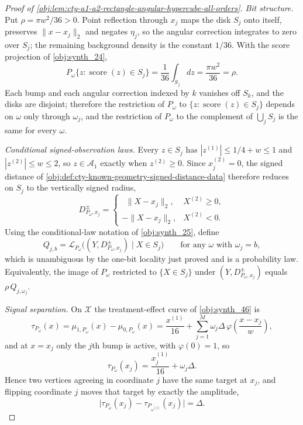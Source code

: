 \begin{proof}[Proof of \cref{obj:lem:cty-a1-a2-rectangle-angular-hypercube-all-orders}]
\emph{Bit structure.}
Put \(\rho=\pi w^2/36>0\).  Point reflection through \(x_j\) maps the disk \(S_j\) onto itself, preserves \(\lVert x-x_j\rVert_2\) and negates \(\eta_j\), so the angular correction integrates to zero over \(S_j\); the remaining background density is the constant \(1/36\).  With the score projection of \cref{obj:synth_24},
\[
P_\omega\{z:\operatorname{score}(z)\in S_j\}
=
\frac1{36}\int_{S_j}dz
=
\frac{\pi w^2}{36}
=\rho .
\]
Each bump and each angular correction indexed by \(k\) vanishes off \(S_k\), and the disks are disjoint; therefore the restriction of \(P_\omega\) to \(\{z:\operatorname{score}(z)\in S_j\}\) depends on \(\omega\) only through \(\omega_j\), and the restriction of \(P_\omega\) to the complement of \(\bigcup_{j}S_j\) is the same for every \(\omega\).

\emph{Conditional signed-observation laws.}
Every \(z\in S_j\) has \(|z^{(1)}|\leq1/4+w\leq1\) and \(|z^{(2)}|\leq w\leq2\), so \(z\in\mathcal A_1\) exactly when \(z^{(2)}\geq0\).  Since \(x_j^{(2)}=0\), the signed distance of \cref{obj:def:cty-known-geometry-signed-distance-data} therefore reduces on \(S_j\) to the vertically signed radius,
\[
D^{\pm}_{P_\omega,x_j}
=
\begin{cases}
\ \ \lVert X-x_j\rVert_2, & X^{(2)}\geq 0,\\
-\lVert X-x_j\rVert_2, & X^{(2)}<0 .
\end{cases}
\]
Using the conditional-law notation of \cref{obj:synth_25}, define
\[
Q_{j,b}
=
\mathcal L_{P_\omega}\bigl((Y,D^{\pm}_{P_\omega,x_j})\mid X\in S_j\bigr)
\qquad\text{for any }\omega\text{ with }\omega_j=b ,
\]
which is unambiguous by the one-bit locality just proved and is a probability law.  Equivalently, the image of \(P_\omega\) restricted to \(\{X\in S_j\}\) under \((Y,D^{\pm}_{P_\omega,x_j})\) equals \(\rho\,Q_{j,\omega_j}\).

\emph{Signal separation.}
On \(\mathcal X\) the treatment-effect curve of \cref{obj:synth_46} is
\[
\tau_{P_\omega}(x)=\mu_{1,P_\omega}(x)-\mu_{0,P_\omega}(x)
=\frac{x^{(1)}}{16}+\sum_{j=1}^{M}\omega_j\Delta\,\varphi\!\left(\frac{x-x_j}{w}\right),
\]
and at \(x=x_j\) only the \(j\)th bump is active, with \(\varphi(0)=1\), so
\[
\tau_{P_\omega}(x_j)=\frac{x_j^{(1)}}{16}+\omega_j\Delta .
\]
Hence two vertices agreeing in coordinate \(j\) have the same target at \(x_j\), and flipping coordinate \(j\) moves that target by exactly the amplitude,
\[
\bigl|\tau_{P_\omega}(x_j)-\tau_{P_{\omega^{(j)}}}(x_j)\bigr|=\Delta .
\]


\end{proof}
